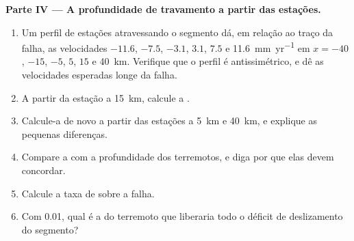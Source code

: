\begin{problem}
\medskip
\noindent\textbf{Parte IV --- A profundidade de travamento a partir das estações.}
\begin{enumerate}[resume]
  \item Um perfil de estações atravessando o segmento dá, em relação ao traço da falha, as velocidades $-11.6$, $-7.5$, $-3.1$, $3.1$, $7.5$ e
        \qty{11.6}{mm.yr^{-1}} em $x = -40$, $-15$, $-5$, $5$, $15$ e \qty{40}{km}. Verifique que o perfil é antissimétrico, e dê as velocidades esperadas longe da falha.
  \item A partir da estação a \qty{15}{km}, calcule a .
  \item Calcule-a de novo a partir das estações a \qty{5}{km} e \qty{40}{km}, e explique as pequenas diferenças.
  \item Compare a  com a profundidade dos terremotos, e diga por que elas devem concordar.
  \item Calcule a taxa de  sobre a falha.
  \item Com 0.01, qual é a  do terremoto que liberaria todo o déficit de deslizamento do segmento?
\end{enumerate}
\end{problem}
